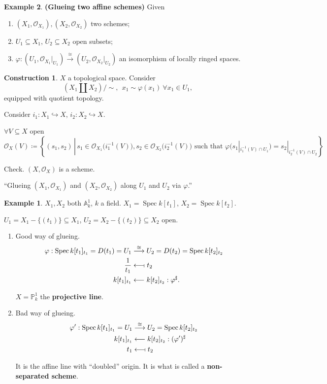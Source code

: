 \documentclass[12pt]{article}
\DeclareMathOperator{\Spec}{Spec}
\theoremstyle{definition}
\newtheorem*{example}{Example}
\newtheorem*{construction}{Construction}
\begin{document}
\begin{example}
\textbf{(Glueing two affine schemes)} Given
\begin{enumerate}[label=\arabic*)]
\item $(X_1,\mathcal{O}_{X_1}),(X_2,\mathcal{O}_{X_2})$ two schemes;
\item $U_1\subseteq X_1$, $U_2\subseteq X_2$ open subsets;
\item $\varphi:(U_1,\mathcal{O}_{X_1}|_{U_1})\xrightarrow{\cong}(U_2,\mathcal{O}_{X_2}|_{U_2})$ an isomorphism of locally ringed spaces.
\end{enumerate}

\begin{construction}
$X$ a topological space. Consider
\[\left(X_1\coprod X_2\right)/\sim,\ \ x_1\sim\varphi(x_1)\ \forall x_1\in U_1,\]
equipped with quotient topology.

Consider $i_1:X_1\hookrightarrow X$, $i_2:X_2\hookrightarrow X$.

$\forall V\subseteq X$ open
\[\mathcal{O}_X(V)\coloneqq\left\{(s_1,s_2)\,\left|\,s_1\in\mathcal{O}_{X_1}\big(i_1^{-1}(V)\big),s_2\in\mathcal{O}_{X_2}\big(i_2^{-1}(V)\big)\text{ such that }\varphi\big(s_1|_{i_1^{-1}(V)\cap U_1}\big)=s_2|_{i_2^{-1}(V)\cap U_2}\right.\right\}\]

Check. $(X,\mathcal{O}_X)$ is a scheme.
\end{construction}

``Glueing $(X_1,\mathcal{O}_{X_1})$ and $(X_2,\mathcal{O}_{X_2})$ along $U_1$ and $U_2$ via $\varphi$.''

\begin{example}
$X_1,X_2$ both $\mathbb{A}_k^1$, $k$ a field. $X_1=\Spec k[t_1]$, $X_2=\Spec k[t_2]$.

$U_1=X_1-\{(t_1)\}\subseteq X_1$, $U_2=X_2-\{(t_2)\}\subseteq X_2$ open.

\begin{enumerate}[label=\alph*)]
\item Good way of glueing.
\begin{align*}
\varphi:\Spec k[t_1]_{t_1}=D(t_1)=U_1&\overset{\cong}{\longrightarrow}U_2=D(t_2)=\Spec k[t_2]_{t_2}\\
\frac{1}{t_1}&\longleftarrow\!\shortmid t_2\\
k[t_1]_{t_1}&\longleftarrow k[t_2]_{t_2}:\varphi^{\sharp}.
\end{align*}

$X=\mathbb{P}_k^1$ the \textbf{projective line}.

\item Bad way of glueing.
\begin{align*}
\varphi':\Spec k[t_1]_{t_1}=U_1&\overset{\cong}{\longrightarrow}U_2=\Spec k[t_2]_{t_2}\\
k[t_1]_{t_1}&\longleftarrow k[t_2]_{t_2}:(\varphi')^{\sharp}\\
t_1&\longleftarrow\!\shortmid t_2
\end{align*}

It is the affine line with ``doubled'' origin. It is what is called a \textbf{non-separated scheme}.
\end{enumerate}
\end{example}
\end{example}
\end{document}
